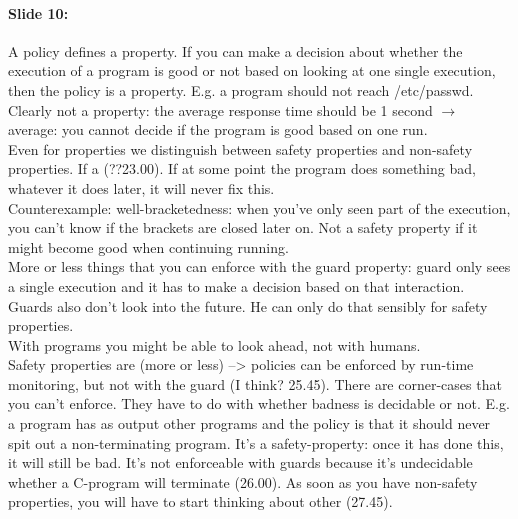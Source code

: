 \documentclass[10pt,a4paper]{report}
\begin{document}
\paragraph{Slide 10:} A policy defines a property. If you can make a decision about whether the execution of a program is good or not based on looking at one single execution, then the policy is a property. E.g. a program should not reach /etc/passwd. Clearly not a property: the average response time should be 1 second $\rightarrow$ average: you cannot decide if the program is good based on one run.\\ %
Even for properties we distinguish between safety properties and non-safety properties. If a (??23.00). If at some point the program does something bad, whatever it does later, it will never fix this.\\
Counterexample: well-bracketedness: when you've only seen part of the execution, you can't know if the brackets are closed later on. Not a safety property if it might become good when continuing running.\\
More or less things that you can enforce with the guard property: guard only sees a single execution and it has to make a decision based on that interaction. Guards also don't look into the future. He can only do that sensibly for safety properties. \\
With programs you might be able to look ahead, not with humans.\\
Safety properties are (more or less) --> policies can be enforced by run-time monitoring, but not with the guard (I think? 25.45). There are corner-cases that you can't enforce. They have to do with whether badness is decidable or not. E.g. a program has as output other programs and the policy is that it should never spit out a non-terminating program. It's a safety-property: once it has done this, it will still be bad. It's not enforceable with guards because it's undecidable whether a C-program will terminate (26.00).
As soon as you have non-safety properties, you will have to start thinking about other (27.45).
\end{document}
